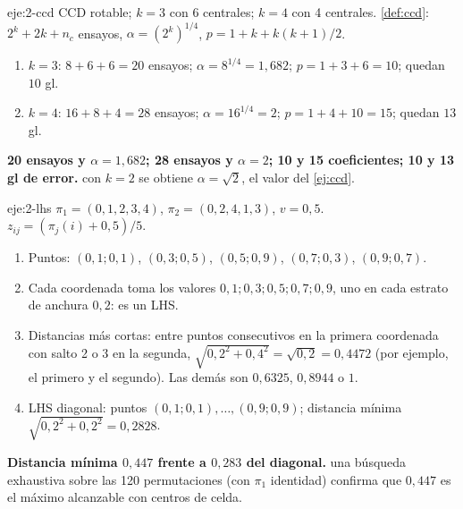 \begin{solucion}{eje:2-ccd}
\datos CCD rotable; $k=3$ con 6 centrales; $k=4$ con 4 centrales.
\planteamiento \cref{def:ccd}: $2^k+2k+n_c$ ensayos, $\alpha=(2^k)^{1/4}$, $p=1+k+k(k+1)/2$.
\pasos
\begin{enumerate}[label=\arabic*.]
  \item $k=3$: $8+6+6=20$ ensayos; $\alpha=8^{1/4}=1{,}682$; $p=1+3+6=10$; quedan $10$ gl.
  \item $k=4$: $16+8+4=28$ ensayos; $\alpha=16^{1/4}=2$; $p=1+4+10=15$; quedan $13$ gl.
\end{enumerate}
\resultado \textbf{20 ensayos y $\alpha=1{,}682$; 28 ensayos y $\alpha=2$; 10 y 15 coeficientes; 10 y 13 gl de error.}
\comprobacion con $k=2$ se obtiene $\alpha=\sqrt2$, el valor del \cref{ej:ccd}.
\end{solucion}

\begin{solucion}{eje:2-lhs}
\datos $\pi_1=(0,1,2,3,4)$, $\pi_2=(0,2,4,1,3)$, $v=0{,}5$.
\planteamiento $z_{ij}=(\pi_j(i)+0{,}5)/5$.
\pasos
\begin{enumerate}[label=\arabic*.]
  \item Puntos: $(0{,}1;0{,}1)$, $(0{,}3;0{,}5)$, $(0{,}5;0{,}9)$, $(0{,}7;0{,}3)$, $(0{,}9;0{,}7)$.
  \item Cada coordenada toma los valores $0{,}1;0{,}3;0{,}5;0{,}7;0{,}9$, uno en cada estrato de anchura $0{,}2$: es un LHS.
  \item Distancias más cortas: entre puntos consecutivos en la primera coordenada con salto 2 o 3 en la segunda, $\sqrt{0{,}2^2+0{,}4^2}=\sqrt{0{,}2}=0{,}4472$ (por ejemplo, el primero y el segundo). Las demás son $0{,}6325$, $0{,}8944$ o $1$.
  \item LHS diagonal: puntos $(0{,}1;0{,}1),\dots,(0{,}9;0{,}9)$; distancia mínima $\sqrt{0{,}2^2+0{,}2^2}=0{,}2828$.
\end{enumerate}
\resultado \textbf{Distancia mínima $0{,}447$ frente a $0{,}283$ del diagonal.}
\comprobacion una búsqueda exhaustiva sobre las 120 permutaciones (con $\pi_1$ identidad) confirma que $0{,}447$ es el máximo alcanzable con centros de celda.
\end{solucion}

